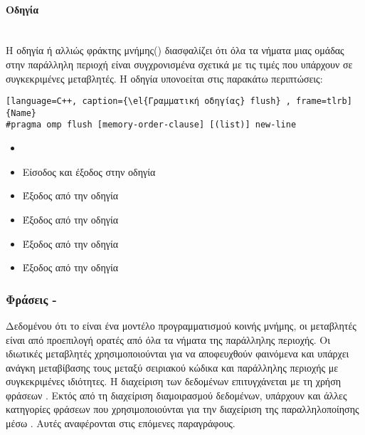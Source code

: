 
\paragraph{Οδηγία \emph{}}
\ \\
Η οδηγία \textbf{} ή αλλιώς φράκτης μνήμης() διασφαλίζει ότι όλα τα νήματα μιας ομάδας στην παράλληλη περιοχή είναι συγχρονισμένα
σχετικά με τις τιμές που υπάρχουν σε συγκεκριμένες μεταβλητές. Η οδηγία \emph{} υπονοείται στις παρακάτω
περιπτώσεις\cite{ibm_flush}:
\begin{lstlisting}[language=C++, caption={\el{Γραμματική οδηγίας} flush} , frame=tlrb]{Name} 
#pragma omp flush [memory-order-clause] [(list)] new-line

\end{lstlisting}

\begin{itemize}
\item{\emph{}}
\item{Είσοδος και έξοδος στην οδηγία \emph{}}
\item{Έξοδος από την οδηγία \emph{}}
\item{Έξοδος από την οδηγία \emph{}}
\item{Έξοδος από την οδηγία \emph{}}
\item{Έξοδος από την οδηγία \emph{}}
\end{itemize}


\clearpage


\subsubsection{Φράσεις - }
Δεδομένου ότι το \emph{} είναι ένα μοντέλο προγραμματισμού κοινής μνήμης, οι μεταβλητές είναι από προεπιλογή
ορατές από όλα τα νήματα της παράλληλης περιοχής. Οι ιδιωτικές μεταβλητές χρησιμοποιούνται για να
αποφευχθούν φαινόμενα \emph{} και υπάρχει ανάγκη μεταβίβασης τους μεταξύ σειριακού κώδικα και
παράλληλης περιοχής με συγκεκριμένες ιδιότητες. Η διαχείριση των δεδομένων επιτυγχάνεται με τη χρήση φράσεων
\textbf{}. Εκτός από τη διαχείριση διαμοιρασμού δεδομένων, υπάρχουν και άλλες κατηγορίες φράσεων που
χρησιμοποιούνται για την διαχείριση της παραλληλοποίησης μέσω \emph{}. Αυτές αναφέρονται στις επόμενες
παραγράφους.
